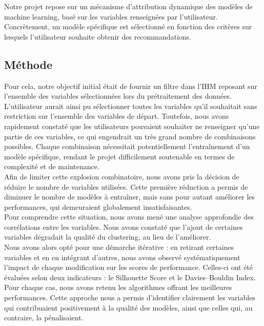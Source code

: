 \documentclass[a4paper, 12pt, twoside]{report}
\begin{document}
	Notre projet repose sur un mécanisme d’attribution dynamique des modèles de machine learning, basé sur les variables renseignées par l'utilisateur. Concrètement, un modèle spécifique est sélectionné en fonction des critères sur lesquels l’utilisateur souhaite obtenir des recommandations.

		\subsection{Méthode}
		
		Pour cela, notre objectif initial était de fournir un filtre dans l’IHM reposant sur l'ensemble des variables sélectionnées lors du prétraitement des données. L’utilisateur aurait ainsi pu sélectionner toutes les variables qu’il souhaitait sans restriction sur l’ensemble des variables de départ. Toutefois, nous avons rapidement constaté que les utilisateurs pouvaient souhaiter ne renseigner qu’une partie de ces variables, ce qui engendrait un très grand nombre de combinaisons possibles. Chaque combinaison nécessitait potentiellement l'entraînement d'un modèle spécifique, rendant le projet difficilement soutenable en termes de complexité et de maintenance. \\

	Afin de limiter cette explosion combinatoire, nous avons pris la décision de réduire le nombre de variables utilisées. Cette première réduction a permis de diminuer le nombre de modèles à entraîner, mais sans pour autant améliorer les performances, qui demeuraient globalement insatisfaisantes. \\

	Pour comprendre cette situation, nous avons mené une analyse approfondie des corrélations entre les variables. Nous avons constaté que l’ajout de certaines variables dégradait la qualité du clustering, au lieu de l'améliorer. \\

	Nous avons alors opté pour une démarche itérative : en retirant certaines variables et en en intégrant d'autres, nous avons observé systématiquement l'impact de chaque modification sur les scores de performance. Celles-ci ont été évaluées selon deux indicateurs : le Silhouette Score et le Davies–Bouldin Index. Pour chaque cas, nous avons retenu les algorithmes offrant les meilleures performances. Cette approche nous a permis d’identifier clairement les variables qui contribuaient positivement à la qualité des modèles, ainsi que celles qui, au contraire, la pénalisaient.
		
\end{document}
